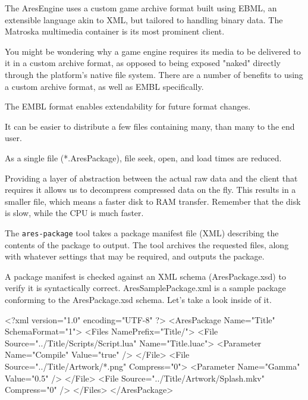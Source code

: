 


The AresEngine uses a custom game archive format built using EBML, an extensible language akin to XML, but tailored to handling binary data. The Matroska multimedia container is its most prominent client.

You might be wondering why a game engine requires its media to be delivered to it in a custom archive format, as opposed to being exposed "naked" directly through the platform's native file system. There are a number of benefits to using a custom archive format, as well as EMBL specifically.

\startitemize[4]
\item
The EMBL format enables extendability for future format changes.

\item
It can be easier to distribute a few files containing many, than many to the end user.

\item
As a single file (*.AresPackage), file seek, open, and load times are reduced.

\item
Providing a layer of abstraction between the actual raw data and the client that requires it allows us to decompress compressed data on the fly. This results in a smaller file, which means a faster disk to RAM transfer. Remember that the disk is slow, while the CPU is much faster.
\stopitemize

The {\tt ares-package} tool takes a package manifest file (XML) describing the contents of the package to output. The tool archives the requested files, along with whatever settings that may be required, and outputs the package.

A package manifest is checked against an XML schema (AresPackage.xsd) to verify it is syntactically correct. AresSamplePackage.xml is a sample package conforming to the AresPackage.xsd schema. Let's take a look inside of it.

\startCodeExample
<?xml version="1.0" encoding="UTF-8" ?>
<AresPackage Name="Title" SchemaFormat="1">
    <Files NamePrefix="Title/">
        <File Source="../Title/Scripts/Script.lua" Name="Title.luac">
            <Parameter Name="Compile" Value="true" />
        </File>
        <File Source="../Title/Artwork/*.png" Compress="0">
            <Parameter Name="Gamma" Value="0.5" />
        </File>
        <File Source="../Title/Artwork/Splash.mkv" Compress="0" />
    </Files>
</AresPackage>
\stopCodeExample

